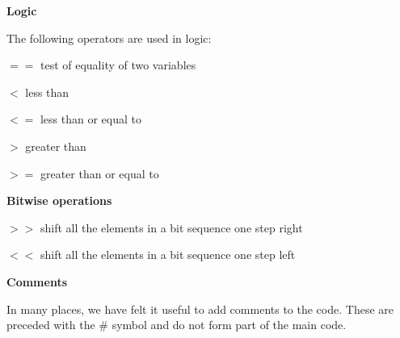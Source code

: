 \textbf{Logic}

The following operators are used in logic:

$= =$ 	test of equality of two variables

$<$	less than

$<=$	less than or equal to

$>$	greater than

$>=$	greater than or equal to

\textbf{Bitwise operations}

$>>$	shift all the elements in a bit sequence one step right

$<<$	shift all the elements in a bit sequence one step left

\textbf{Comments}

In many places, we have felt it useful to add comments to the code.
These are preceded with the \# symbol and do not form part of the main
code.
